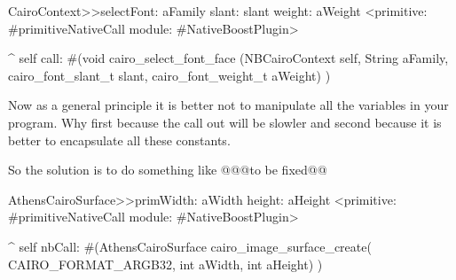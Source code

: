 \documentclass[a4paper,10pt,twoside]{book}
\begin{document}
\begin{code}{}
CairoContext>>selectFont: aFamily slant: slant weight: aWeight
	<primitive: #primitiveNativeCall module: #NativeBoostPlugin>
	
	^ self call: #(void cairo_select_font_face (NBCairoContext self,
                                                         String aFamily,
                                                         cairo_font_slant_t slant,
                                                         cairo_font_weight_t aWeight) )
\end{code}


Now as a general principle it is better not to manipulate all the variables in your program. Why first because the call out will be slowler and second because it is better to encapsulate all these constants.

So the solution is to do something like
@@@to be fixed@@
\begin{code}{}
AthensCairoSurface>>primWidth: aWidth height: aHeight
	<primitive: #primitiveNativeCall module: #NativeBoostPlugin>
	
	^ self nbCall: #(AthensCairoSurface cairo_image_surface_create(
				CAIRO_FORMAT_ARGB32,
					int aWidth,
					int aHeight) )
	
\end{code}

% 
% 
% 
\end{document}
